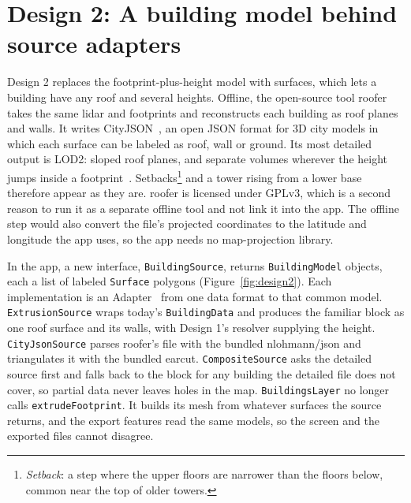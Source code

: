 \documentclass[11pt,letterpaper]{article}
\begin{document}
\section*{Design 2: A building model behind source adapters}

Design 2 replaces the footprint-plus-height model with surfaces, which lets a building have any roof and several heights. Offline, the open-source tool roofer~\cite{roofer} takes the same lidar and footprints and reconstructs each building as roof planes and walls. It writes CityJSON~\cite{cityjson}, an open JSON format for 3D city models in which each surface can be labeled as roof, wall or ground. Its most detailed output is LOD2: sloped roof planes, and separate volumes wherever the height jumps inside a footprint~\cite{biljecki}. Setbacks\footnote{\emph{Setback}: a step where the upper floors are narrower than the floors below, common near the top of older towers.} and a tower rising from a lower base therefore appear as they are. roofer is licensed under GPLv3, which is a second reason to run it as a separate offline tool and not link it into the app. The offline step would also convert the file's projected coordinates to the latitude and longitude the app uses, so the app needs no map-projection library.

In the app, a new interface, \texttt{BuildingSource}, returns \texttt{BuildingModel} objects, each a list of labeled \texttt{Surface} polygons (Figure~\ref{fig:design2}). Each implementation is an Adapter~\cite{gof} from one data format to that common model. \texttt{ExtrusionSource} wraps today's \texttt{BuildingData} and produces the familiar block as one roof surface and its walls, with Design 1's resolver supplying the height. \texttt{CityJsonSource} parses roofer's file with the bundled nlohmann/json and triangulates it with the bundled earcut. \texttt{CompositeSource} asks the detailed source first and falls back to the block for any building the detailed file does not cover, so partial data never leaves holes in the map. \texttt{BuildingsLayer} no longer calls \texttt{extrudeFootprint}. It builds its mesh from whatever surfaces the source returns, and the export features read the same models, so the screen and the exported files cannot disagree.
\end{document}
